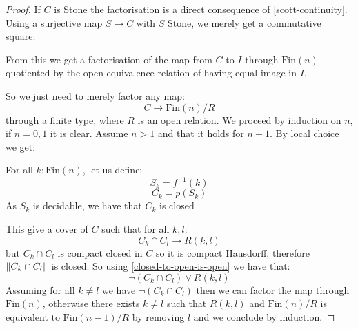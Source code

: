\begin{proof}
If $C$ is Stone the factorisation is a direct consequence of \cref{scott-continuity}. Using a surjective map $S\to C$ with $S$ Stone, we merely get a commutative square:
\begin{center}
\end{center}
From this we get a factorisation of the map from $C$ to $I$ through $\mathrm{Fin}(n)$ quotiented by the open equivalence relation of having equal image in $I$.

So we just need to merely factor any map:
\[C\to \mathrm{Fin}(n)/R\] 
through a finite type, where $R$ is an open relation. We proceed by induction on $n$, if $n=0,1$ it is clear. Assume $n>1$ and that it holds for $n-1$. By local choice we get:

\begin{center}
\end{center}

For all $k:\mathrm{Fin}(n)$, let us define:
\[S_k = f^{-1}(k)\]
\[C_k = p(S_k)\]
As $S_k$ is decidable, we have that $C_k$ is closed

This give a cover of $C$ such that for all $k,l$:
\[C_k\cap C_l \to R(k,l)\]
but $C_k\cap C_l$ is compact closed in $C$ so it is compact Hausdorff, therefore $\lVert C_k\cap C_l \rVert$ is closed. So using \cref{closed-to-open-is-open} we have that:
\[\neg(C_k\cap C_l) \lor R(k,l)\]
Assuming for all $k\not=l$ we have $\neg(C_k\cap C_l)$ then we can factor the map through $\mathrm{Fin}(n)$, otherwise there exists $k\not=l$ such that $R(k,l)$ and $\mathrm{Fin}(n)/R$ is equivalent to $\mathrm{Fin}(n-1)/R$ by removing $l$ and we conclude by induction.
\end{proof}

